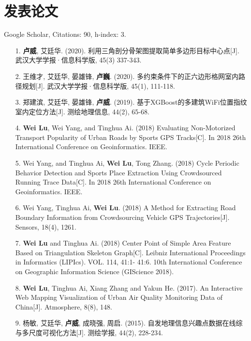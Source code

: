 \documentclass{resume}
\begin{document}
\section{发表论文}
Google Scholar, Citations: 90, h-index: 3.
\begin{itemize}[parsep=1.0ex]
\item[1.] \textbf{卢威}, 艾廷华. (2020). 利用三角剖分骨架图提取简单多边形目标中心点[J]. 武汉大学学报·信息科学版, 45(3) 337-343. 

\item[2.] 王维才, 艾廷华, 晏雄锋, \textbf{卢巍}. (2020). 多约束条件下的正六边形格网室内路径规划[J]. 武汉大学学报·信息科学版, 45(1), 111-118.

\item[3.] 郑建滨, 艾廷华, 晏雄锋, \textbf{卢威}. (2019). 基于XGBoost的多建筑WiFi位置指纹室内定位方法[J]. 测绘地理信息, 44(2), 65-68.

\item[4.] \textbf{Wei Lu}, Wei Yang, and Tinghua Ai. (2018) Evaluating Non-Motorized Transport Popularity of Urban Roads by Sports GPS Tracks[C]. In 2018 26th International Conference on Geoinformatics. IEEE. 

\item[5.] Wei Yang, and Tinghua Ai, \textbf{Wei Lu}, Tong Zhang. (2018) Cycle Periodic Behavior Detection and Sports Place Extraction Using Crowdsourced Running Trace Data[C]. In 2018 26th International Conference on Geoinformatics. IEEE. 

\item[6.] Wei Yang, Tinghua Ai, \textbf{Wei Lu}. (2018) A Method for Extracting Road Boundary Information from Crowdsourcing Vehicle GPS Trajectories[J]. Sensors, 18(4), 1261.

\item[7.] \textbf{Wei Lu} and Tinghua Ai. (2018) Center Point of Simple Area Feature Based on Triangulation Skeleton Graph[C]. Leibniz International Proceedings in Informatics (LIPIcs). VOL. 114, 41:1- 41:6. 10th International Conference on Geographic Information Science (GIScience 2018). 

\item[8.] \textbf{Wei Lu}, Tinghua Ai, Xiang Zhang and Yakun He. (2017). An Interactive Web Mapping Visualization of Urban Air Quality Monitoring Data of China[J]. Atmosphere, 8(8), 148. 

\item[9.] 杨敏, 艾廷华, \textbf{卢威}, 成晓强, 周启. (2015). 自发地理信息兴趣点数据在线综与多尺度可视化方法[J]. 测绘学报, 44(2), 228-234. 
\end{itemize}
\end{document}
